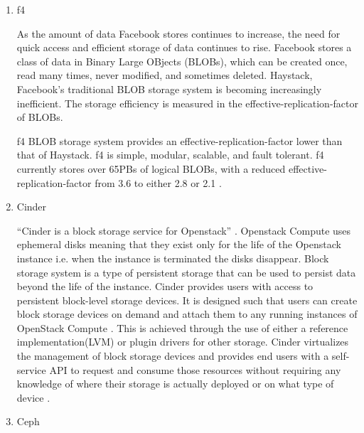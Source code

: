 \begin{enumerate}
\item {} 
f4

As the amount of data Facebook stores continues to increase, the
need for quick access and efficient storage of data continues to
rise.  Facebook stores a class of data in Binary Large OBjects
(BLOBs), which can be created once, read many times, never
modified, and sometimes deleted. Haystack, Facebook’s traditional
BLOB storage system is becoming increasingly inefficient. The
storage efficiency is measured in the
effective-replication-factor of BLOBs.

f4 BLOB storage system provides an effective-replication-factor
lower than that of Haystack. f4 is simple, modular, scalable, and
fault tolerant. f4 currently stores over 65PBs of logical BLOBs,
with a reduced effective-replication-factor from 3.6 to either
2.8 or 2.1 \label{\detokenize{i524/technologies:id533}}{\hyperref[\detokenize{i524/technologies:paper-f4}]{\sphinxcrossref{{[}458{]}}}}.

\item {} 
Cinder

``Cinder is a block storage service for Openstack''
\label{\detokenize{i524/technologies:id534}}{\hyperref[\detokenize{i524/technologies:wiki-cinder}]{\sphinxcrossref{{[}459{]}}}}. Openstack Compute uses ephemeral disks
meaning that they exist only for the life of the Openstack
instance i.e. when the instance is terminated the disks
disappear. Block storage system is a type of persistent storage
that can be used to persist data beyond the life of the
instance. Cinder provides users with access to persistent
block-level storage devices. It is designed such that users can
create block storage devices on demand and attach them to any
running instances of OpenStack Compute \label{\detokenize{i524/technologies:id535}}{\hyperref[\detokenize{i524/technologies:book-cinder}]{\sphinxcrossref{{[}460{]}}}}. This
is achieved through the use of either a reference
implementation(LVM) or plugin drivers for other storage. Cinder
virtualizes the management of block storage devices and provides
end users with a self-service API to request and consume those
resources without requiring any knowledge of where their storage
is actually deployed or on what type of device
\label{\detokenize{i524/technologies:id536}}{\hyperref[\detokenize{i524/technologies:wiki-cinder}]{\sphinxcrossref{{[}459{]}}}}.

\item {} 
Ceph


\end{enumerate}
